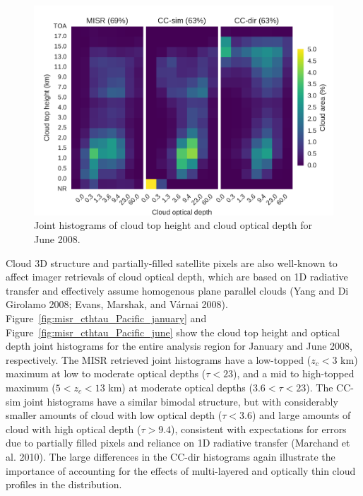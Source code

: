 \begin{figure}[htbp]
\centering
\includegraphics{graphics/misr_clmisr_Pacific_2008-06.pdf}
\caption{\label{fig:misr_cthtau_Pacific_june}Joint histograms of cloud
top height and cloud optical depth for June
2008.}\label{fig:misrux5fcthtauux5fPacificux5fjune}
\end{figure}

Cloud 3D structure and partially-filled satellite pixels are also
well-known to affect imager retrievals of cloud optical depth, which are
based on 1D radiative transfer and effectively assume homogenous plane
parallel clouds (Yang and Di Girolamo 2008; Evans, Marshak, and Várnai
2008). Figure~\ref{fig:misr_cthtau_Pacific_january} and
Figure~\ref{fig:misr_cthtau_Pacific_june} show the cloud top height and
optical depth joint histograms for the entire analysis region for
January and June 2008, respectively. The MISR retrieved joint histograms
have a low-topped (\(z_c < 3\) km) maximum at low to moderate optical
depths (\(\tau < 23\)), and a mid to high-topped maximum
(\(5 < z_c < 13\) km) at moderate optical depths (\(3.6 < \tau < 23\)).
The CC-sim joint histograms have a similar bimodal structure, but with
considerably smaller amounts of cloud with low optical depth
(\(\tau < 3.6\)) and large amounts of cloud with high optical depth
(\(\tau > 9.4\)), consistent with expectations for errors due to
partially filled pixels and reliance on 1D radiative transfer (Marchand
et al. 2010). The large differences in the CC-dir histograms again
illustrate the importance of accounting for the effects of multi-layered
and optically thin cloud profiles in the distribution.

